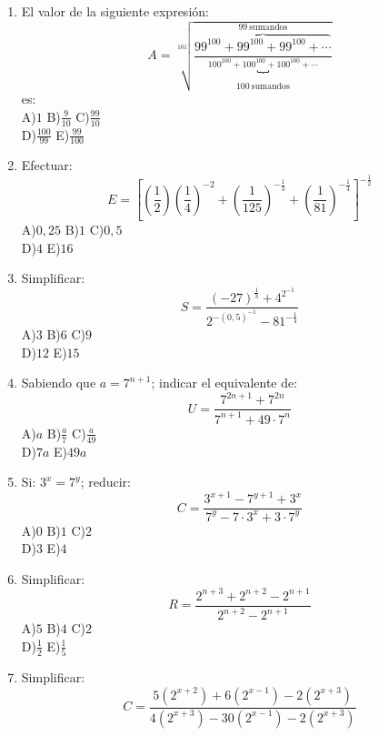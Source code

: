 \documentclass[
  10pt,
]{article}
\begin{document}
\begin{enumerate}
  El valor de la siguiente expresión:\\
  \[S = \sqrt[7]{\frac{5^{6} + 5^{6} + 5^{6} + 5^{6} + 5^{6}}{6^{6} + 6^{6} + 6^{6} + 6^{6} + 6^{6} + 6^{6}}}
  \] es:\\
  A)\(1\) B)\(30\) C)\(\frac{5}{6}\)\\
  D)\(\frac{6}{5}\) E)\(\sqrt[7]{\left( \frac{5}{6} \right)^{6}}\)
\item
  El valor de la siguiente expresión:\\
  \[A = \sqrt[101]{\frac{\overset{99\ \text{sumandos}}{\overbrace{99^{100} + 99^{100} + 99^{100} + \cdots}}}{\underset{100\ \text{sumandos}}{\overset{100^{100} + 100^{100} + 100^{100} + \cdots}{︸}}}}
  \] es:\\
  A)\(1\) B)\(\frac{9}{10}\) C)\(\frac{99}{10}\)\\
  D)\(\frac{100}{99}\) E)\(\frac{99}{100}\)
\item
  Efectuar:\\
  \[E = \left\lbrack \left( \frac{1}{2} \right)\left( \frac{1}{4} \right)^{- 2} + \left( \frac{1}{125} \right)^{- \frac{1}{3}} + \left( \frac{1}{81} \right)^{- \frac{1}{4}} \right\rbrack^{- \frac{1}{2}}
  \]A)\(0,25\) B)\(1\) C)\(0,5\)\\
  D)\(4\) E)\(16\)
\item
  Simplificar:\\
  \[S = \frac{( - 27)^{\frac{1}{3}} + 4^{2^{- 1}}}{2^{- (0,5)^{- 1}} - 81^{- \frac{1}{4}}}
  \]A)\(3\) B)\(6\) C)\(9\)\\
  D)\(12\) E)\(15\)
\item
  Sabiendo que \(a = 7^{n + 1}\); indicar el equivalente de:\\
  \[U = \frac{7^{2n + 1} + 7^{2n}}{7^{n + 1} + 49 \cdot 7^{n}}
  \]A)\(a\) B)\(\frac{a}{7}\) C)\(\frac{a}{49}\)\\
  D)\(7a\) E)\(49a\)
\item
  Si: \(3^{x} = 7^{y}\); reducir:\\
  \[C = \frac{3^{x + 1} - 7^{y + 1} + 3^{x}}{7^{y} - 7 \cdot 3^{x} + 3 \cdot 7^{y}}
  \]A)\(0\) B)\(1\) C)\(2\)\\
  D)\(3\) E)\(4\)
\item
  Simplificar:\\
  \[R = \frac{2^{n + 3} + 2^{n + 2} - 2^{n + 1}}{2^{n + 2} - 2^{n + 1}}
  \]A)\(5\) B)\(4\) C)\(2\)\\
  D)\(\frac{1}{2}\) E)\(\frac{1}{5}\)
\item
  Simplificar:\\
  \[C = \frac{5\left( 2^{x + 2} \right) + 6\left( 2^{x - 1} \right) - 2\left( 2^{x + 3} \right)}{4\left( 2^{x + 3} \right) - 30\left( 2^{x - 1} \right) - 2\left( 2^{x + 3} \right)}
\]
\end{enumerate}
\end{document}
